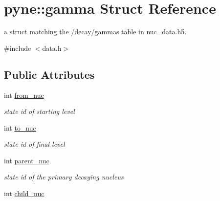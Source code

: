 \hypertarget{structpyne_1_1gamma}{}\section{pyne\+:\+:gamma Struct Reference}
\label{structpyne_1_1gamma}


a struct matching the \textquotesingle{}/decay/gammas\textquotesingle{} table in nuc\+\_\+data.\+h5.  




{\ttfamily \#include $<$data.\+h$>$}

\subsection*{Public Attributes}
\begin{DoxyCompactItemize}
\item 
int \hyperlink{structpyne_1_1gamma_a1c5b7ef9f75c628193a0872c9ae172e4}{from\+\_\+nuc}\hypertarget{structpyne_1_1gamma_a1c5b7ef9f75c628193a0872c9ae172e4}{}\label{structpyne_1_1gamma_a1c5b7ef9f75c628193a0872c9ae172e4}

\begin{DoxyCompactList}\small\item\em state id of starting level \end{DoxyCompactList}\item 
int \hyperlink{structpyne_1_1gamma_af9ed390289a667c82464c859dbccb0a4}{to\+\_\+nuc}\hypertarget{structpyne_1_1gamma_af9ed390289a667c82464c859dbccb0a4}{}\label{structpyne_1_1gamma_af9ed390289a667c82464c859dbccb0a4}

\begin{DoxyCompactList}\small\item\em state id of final level \end{DoxyCompactList}\item 
int \hyperlink{structpyne_1_1gamma_a947386fa2557f57cc14f79d6904185bd}{parent\+\_\+nuc}\hypertarget{structpyne_1_1gamma_a947386fa2557f57cc14f79d6904185bd}{}\label{structpyne_1_1gamma_a947386fa2557f57cc14f79d6904185bd}

\begin{DoxyCompactList}\small\item\em state id of the primary decaying nucleus \end{DoxyCompactList}\item 
int \hyperlink{structpyne_1_1gamma_a99fcb3ccd78db851f7104ff3ab59048d}{child\+\_\+nuc}\hypertarget{structpyne_1_1gamma_a99fcb3ccd78db851f7104ff3ab59048d}{}\label{structpyne_1_1gamma_a99fcb3ccd78db851f7104ff3ab59048d}


\end{DoxyCompactItemize}
